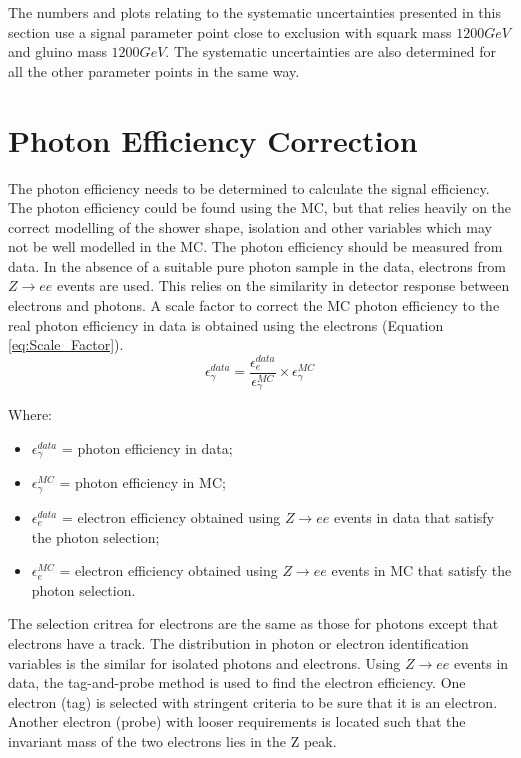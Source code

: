 The numbers and plots relating to the systematic uncertainties presented in this 
section use a signal parameter point close to exclusion with squark mass 
$1200\unit{GeV}$ and gluino mass $1200\unit{GeV}$. The systematic uncertainties
are also determined for all the other parameter points in the same way.

\section{Photon Efficiency Correction}
\label{sec:phoeff}

The photon efficiency needs to be determined to calculate the signal efficiency.
The photon efficiency could be found using the MC, but that relies heavily on
the correct modelling of the shower shape, isolation and other variables which
may not be well modelled in the MC. The photon efficiency should be measured
from data. In the absence of a suitable pure photon sample in the data, 
electrons from $Z\rightarrow ee$ events are used. This relies on the similarity 
in detector response between electrons and photons. A scale factor to correct 
the MC photon efficiency to the real photon efficiency in data is obtained using 
the electrons (Equation \ref{eq:Scale_Factor}). \\

\begin{equation}
\epsilon_{\gamma}^{data} = \frac{\epsilon_{e}^{data}}{\epsilon_{\gamma}^{MC}}
\times \epsilon_{\gamma}^{MC}
\label{eq:Scale_Factor}
\end{equation}  

Where:
\begin{itemize}
\item $\epsilon_{\gamma}^{data}$ = photon efficiency in data;
\item $\epsilon_{\gamma}^{MC}$ = photon efficiency in MC;
\item $\epsilon_{e}^{data}$ = electron efficiency obtained using $Z\rightarrow
ee$ events in data that satisfy the photon selection; 
\item $\epsilon_{e}^{MC}$ = electron efficiency obtained using $Z\rightarrow ee$
events in MC that satisfy the photon selection. 
\end{itemize}

The selection critrea for electrons are the same as those for photons except 
that electrons have a track. The distribution in photon or electron 
identification variables is the similar for isolated photons and electrons. 
Using $Z\rightarrow ee$ events in data, the tag-and-probe method is used to find
the electron efficiency. One electron (tag) is selected with stringent criteria 
to be sure that it is an electron. Another electron (probe) with looser 
requirements is located such that the invariant mass of the two electrons lies 
in the Z peak. \\

